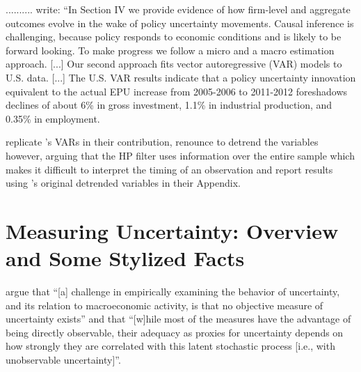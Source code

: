 \documentclass[a4paper,11pt,listof=nochaptergap,oneside,pointednumbers,bibtotoc,bigheadings,liststotoc,hidelinks]{scrbook}
\theoremstyle{mysatz}
\theoremstyle{mydefinition}
\theoremstyle{mytheorem}
\theoremstyle{mybemerkung}
\begin{document}
\citet{bakeretal:15} ..........
\citet[p. 1595]{bakeretal:15} write: ``In Section IV we provide evidence of how firm-level and aggregate outcomes evolve in the wake of policy uncertainty movements. Causal inference is challenging, because policy responds to economic conditions and is likely to be forward looking. To make progress we follow a micro and a macro estimation approach. [...] Our second approach fits vector autoregressive (VAR) models to U.S. data. [...] The U.S. VAR results indicate that a policy uncertainty innovation equivalent to the actual EPU increase from 2005-2006 to 2011-2012 foreshadows declines of about 6\% in gross investment, 1.1\% in industrial production, and 0.35\% in employment. 


\citet{juradoetal:15} replicate \citet{bloom:09}'s VARs in their contribution, renounce to detrend the variables however, arguing that the HP filter uses information over the entire sample which makes it difficult to interpret the timing of an observation and report results using \citet{bloom:09}'s original detrended variables in their Appendix.







\section{Measuring Uncertainty: Overview and Some Stylized Facts}
\label{sec:uncertaintymeasuresandstylizedfacts}

\citet[p. 1178]{juradoetal:15} argue that ``[a] challenge in empirically examining the behavior of uncertainty, and its relation to macroeconomic activity, is that no objective measure of uncertainty exists'' and that ``[w]hile most of the measures have the advantage of being directly observable, their adequacy as proxies for uncertainty depends on how strongly they are correlated with this latent stochastic process [i.e., with unobservable uncertainty]''.
\end{document}
